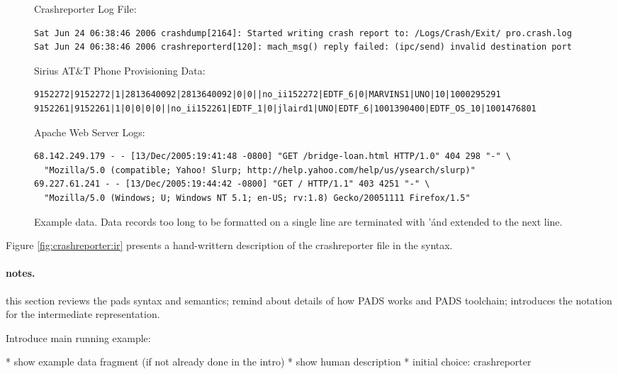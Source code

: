 \begin{figure*}
Crashreporter Log File:
{\small \begin{verbatim}
Sat Jun 24 06:38:46 2006 crashdump[2164]: Started writing crash report to: /Logs/Crash/Exit/ pro.crash.log
Sat Jun 24 06:38:46 2006 crashreporterd[120]: mach_msg() reply failed: (ipc/send) invalid destination port
\end{verbatim}
}

Sirius AT\&T Phone Provisioning Data:
{\small \begin{verbatim}
9152272|9152272|1|2813640092|2813640092|0|0||no_ii152272|EDTF_6|0|MARVINS1|UNO|10|1000295291
9152261|9152261|1|0|0|0|0||no_ii152261|EDTF_1|0|jlaird1|UNO|EDTF_6|1001390400|EDTF_OS_10|1001476801
\end{verbatim}
}

Apache Web Server Logs:
{\small \begin{verbatim}
68.142.249.179 - - [13/Dec/2005:19:41:48 -0800] "GET /bridge-loan.html HTTP/1.0" 404 298 "-" \
  "Mozilla/5.0 (compatible; Yahoo! Slurp; http://help.yahoo.com/help/us/ysearch/slurp)"
69.227.61.241 - - [13/Dec/2005:19:44:42 -0800] "GET / HTTP/1.1" 403 4251 "-" \
  "Mozilla/5.0 (Windows; U; Windows NT 5.1; en-US; rv:1.8) Gecko/20051111 Firefox/1.5"
\end{verbatim}
}
\caption {Example data. 
Data records too long to be formatted on a single line are terminated with '\' and extended to the next line.}
\label{fig:example data}
\end{figure*}

Figure \ref{fig:crashreporter:ir} presents a hand-writtern description
of the crashreporter file in the \ir{} syntax.



\paragraph {notes.}
this section reviews the pads syntax and semantics; 
remind about details of how PADS works and PADS toolchain;
introduces the
notation for the intermediate representation.


Introduce main running example:  

    * show example data fragment (if not already done in the intro)
    * show human description
    * initial choice: crashreporter




